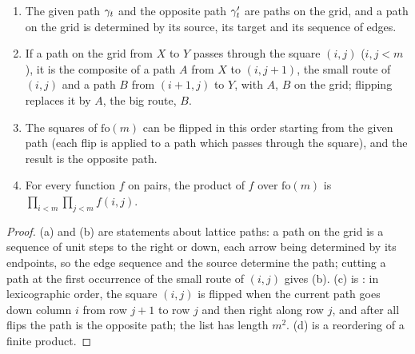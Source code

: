 \begin{lemma}\label{pf:rowprops:flipcomb}
\begin{enumerate}[label=(\alph*)]
\item The given path $\gamma_t$ and the opposite path $\gamma'_t$ are paths on the grid, and a path on the
grid is determined by its source, its target and its sequence of edges.
\item If a path on the grid from $X$ to $Y$ passes through the square $(i,j)$ ($i,j<m$), it is the composite of a path
$A$ from $X$ to $(i,j+1)$, the small route of $(i,j)$ and a path $B$ from $(i+1,j)$ to $Y$, with $A$, $B$ on the grid;
flipping replaces it by $A$, the big route, $B$.
\item The squares of $\mathrm{fo}(m)$ can be flipped in this order starting from the given path (each flip is applied to
a path which passes through the square), and the result is the opposite path.
\item For every function $f$ on pairs, the product of $f$ over $\mathrm{fo}(m)$ is $\prod_{i<m}\prod_{j<m}f(i,j)$.
\end{enumerate}
\end{lemma}

\begin{proof}
(a) and (b) are statements about lattice paths: a path on the grid is a sequence of unit steps to the right or down,
each arrow being determined by its endpoints, so the edge sequence and the source determine the path; cutting a path at
the first occurrence of the small route of $(i,j)$ gives (b). (c) is :
in lexicographic order, the square $(i,j)$ is flipped when the current path goes down column $i$ from row $j+1$ to row
$j$ and then right along row $j$, and after all flips the path is the opposite path; the list has length $m^2$. (d) is a
reordering of a finite product.
\end{proof}

